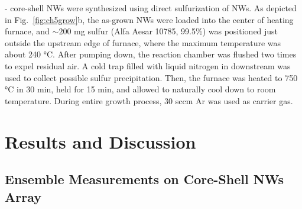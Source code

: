- core-shell NWs were synthesized using direct sulfurization of  NWs. As depicted in Fig.~\ref{fig:ch5grow}b, the as-grown  NWs were loaded into the center of heating furnace, and $\sim200$ mg sulfur (Alfa Aesar 10785, 99.5\%) was positioned just outside the upstream edge of furnace, where the maximum temperature was about 240 \si{\degreeCelsius}. After pumping down, the reaction chamber was flushed two times to expel residual air. A cold trap filled with liquid nitrogen in downstream was used to collect possible sulfur precipitation. Then, the furnace was heated to 750 \si{\degreeCelsius} in 30 min, held for 15 min, and allowed to naturally cool down to room temperature. During entire growth process, 30 sccm Ar was used as carrier gas.

\section{Results and Discussion}
\subsection{Ensemble Measurements on Core-Shell NWs Array}

